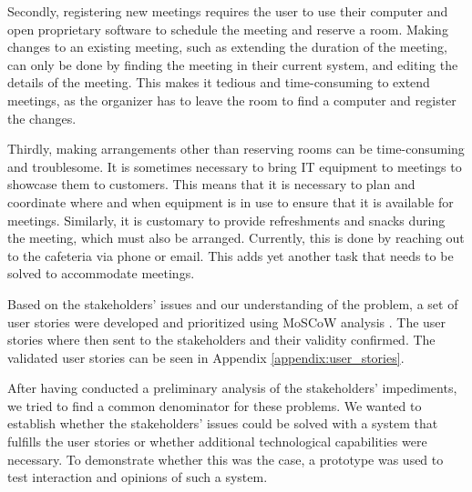 Secondly, registering new meetings requires the user to use their computer and open proprietary software to schedule the meeting and reserve a room.
Making changes to an existing meeting, such as extending the duration of the meeting, can only be done by finding the meeting in their current system, and editing the details of the meeting.
This makes it tedious and time-consuming to extend meetings, as the organizer has to leave the room to find a computer and register the changes.

Thirdly, making arrangements other than reserving rooms can be time-consuming and troublesome. 
It is sometimes necessary to bring IT equipment to meetings to showcase them to customers.
This means that it is necessary to plan and coordinate where and when equipment is in use to ensure that it is available for meetings. 
Similarly, it is customary to provide refreshments and snacks during the meeting, which must also be arranged. 
Currently, this is done by reaching out to the cafeteria via phone or email.
This adds yet another task that needs to be solved to accommodate meetings.

Based on the stakeholders' issues and our understanding of the problem, a set of user stories were developed and prioritized using MoSCoW analysis \cite{DEBbook}.
The user stories where then sent to the stakeholders and their validity confirmed.  
The validated user stories can be seen in Appendix \ref{appendix:user_stories}.

After having conducted a preliminary analysis of the stakeholders' impediments, we tried to find a common denominator for these problems.
We wanted to establish whether the stakeholders' issues could be solved with a system that fulfills the user stories or whether additional technological capabilities were necessary. 
To demonstrate whether this was the case, a prototype was used to test interaction and opinions of such a system.